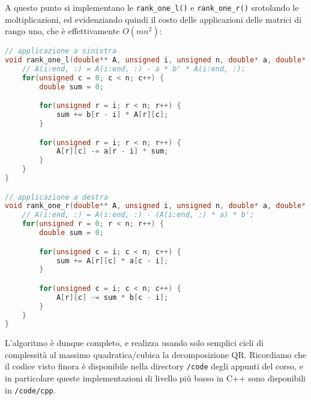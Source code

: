 \documentclass[a4paper,11pt]{article}
\begin{document}
A questo punto si implementano le \lstinline|rank_one_l()| e \lstinline|rank_one_r()| srotolando le moltiplicazioni, ed evidenziando quindi il costo delle applicazioni delle matrici di rango uno, che è effettivamente $O(mn^2)$:
\begin{lstlisting}[language=C++, style=codestyle]	
// applicazione a sinistra
void rank_one_l(double** A, unsigned i, unsigned n, double* a, double* b) {
	// A(i:end, :) = A(i:end, :) - a * b' * A(i:end, :);
	for(unsigned c = 0; c < n; c++) {
		double sum = 0;

		for(unsigned r = i; r < n; r++) {
			sum += b[r - i] * A[r][c]; 
		}

		for(unsigned r = i; r < n; r++) {
			A[r][c] -= a[r - i] * sum;
		}
	}
}

// applicazione a destra
void rank_one_r(double** A, unsigned i, unsigned n, double* a, double* b) {
	// A(i:end, :) = A(i:end, :) - (A(i:end, :) * a) * b';
	for(unsigned r = 0; r < n; r++) {
		double sum = 0;

		for(unsigned c = i; c < n; c++) {
			sum += A[r][c] * a[c - i]; 
		}

		for(unsigned c = i; c < n; c++) {
			A[r][c] -= sum * b[c - i];
		}
	}
}
\end{lstlisting}

L'algoritmo è dunque completo, e realizza usando solo semplici cicli di complessità al massimo quadratica/cubica la decomposizione QR.
Ricordiamo che il codice visto finora è disponibile nella directory \lstinline|/code| degli appunti del corso, e in particolare queste implementazioni di livello più basso in C++ sono disponibili in \lstinline|/code/cpp|.
\end{document}
